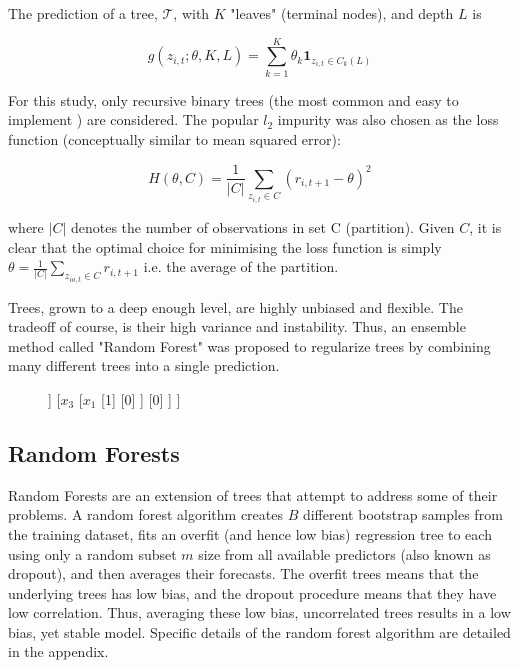 \documentclass[a4paper]{article}
\newcommand{\smalltodo}[2][] {\todo[caption={#2}, size=\scriptsize,%
	fancyline,#1]{\begin{spacing}{.5}#2\end{spacing}}}
\newcommand{\rhs}[2][]{\smalltodo[color=green!30,#1]{{\bf RS:} #2}}
\begin{document}
The prediction of a tree, $\mathcal{T}$, with \(K\) "leaves" (terminal nodes), and depth $L$ is

\begin{equation}
	g(z_{i,t};\theta,K,L) = \sum_{k=1}^{K}\theta_k\textbf{1}_{z_{i,t}\in C_k(L)}
\end{equation}

For this study, only recursive binary trees (the most common and easy to implement ) are considered. The popular $l_2$ impurity was also chosen as the loss function (conceptually similar to mean squared error):

\begin{equation}
	H(\theta, C) = \frac{1}{|C|} \sum_{z_{i,t} \in C} (r_{i,t+1} - \theta)^2
\end{equation}

where $|C|$ denotes the number of observations in set C (partition). Given $C$, it is clear that the optimal choice for minimising the loss function is simply $\theta = \frac{1}{|C|} \sum_{z_{io,t}\in C}^{ }r_{i,t+1}$ i.e. the average of the partition.

Trees, grown to a deep enough level, are highly unbiased and flexible. The tradeoff of course, is their high variance and instability. Thus, an ensemble method called "Random Forest" was proposed to regularize trees by combining many different trees into a single prediction.

\rhs{this diagram needs work}

\begin{figure}
	\begin{center}
		\begin{forest} 
			[$x_2$, tikz={\draw[{Latex}-, thick] (.north) --++ (0,1);}
			[$x_1$
			[1] 
			[0] 
			]   
			[$x_3$
			[$x_1$
			[1] 
			[0] 
			]   
			[0] 
			]   
			] 
		\end{forest}
	\end{center}
\end{figure}

\subsection{Random Forests}
Random Forests are an extension of trees that attempt to address some of their problems. A random forest algorithm creates $B$ different bootstrap samples from the training dataset, fits an overfit (and hence low bias) regression tree to each using only a random subset $m$ size from all available predictors (also known as dropout), and then averages their forecasts. The overfit trees means that the underlying trees has low bias, and the dropout procedure means that they have low correlation. Thus, averaging these low bias, uncorrelated trees results in a low bias, yet stable model. Specific details of the random forest algorithm are detailed in the appendix.
\end{document}
